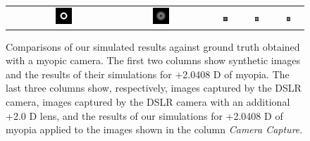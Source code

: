 \begin{figure}[!t]
\begin{tabular}{@{}r@{ } c@{ } c@{ } c@{ } c@{ } c }
	\begin{sideways} \parbox[b]{20mm} {} \end{sideways} &
	\includegraphics[width=0.185\textwidth]{__Images/05/BW_NCKZO_myopia/bw_O_20-200_Sloan@4x} &
	\includegraphics[width=0.185\textwidth]{__Images/05/BW_NCKZO_myopia/bw_O_20-200_Sloan@4x+2,00D(simulated)} &
	\includegraphics[width=0.185\textwidth]{__Images/05/BW_NCKZO_myopia/bw_O_20-200_Camera+0,00D} &
	\includegraphics[width=0.185\textwidth]{__Images/05/BW_NCKZO_myopia/bw_O_20-200_Camera+2,00D(lens)} &
	\includegraphics[width=0.185\textwidth]{__Images/05/BW_NCKZO_myopia/bw_O_20-200_Camera+2,00D(simulated)} \\

	\end{tabular}
	
		\caption[Comparisons of our simulated results against ground truth obtained with a myopic camera]{Comparisons of our simulated results against ground truth obtained with a myopic camera. 
		The first two columns show synthetic images and the results of their simulations for +2.0408 D of myopia. The last three columns show, respectively, images captured by the DSLR camera, images captured by the DSLR camera with an additional +2.0 D lens, and the results of our simulations for +2.0408 D of myopia applied to the images shown in the column {\it Camera Capture}.}
	\label{fig:myopia_nckzo_bw}
\end{figure}
